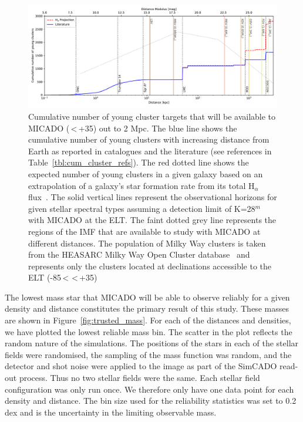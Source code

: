 \documentclass{aa}
\begin{document}
\begin{figure}

    \centering
    \includegraphics[width=\textwidth]{young_clusters_within_2Mpc_incl_MW.pdf}

    \caption{Cumulative number of young cluster targets that will be available to MICADO (\textdelta\,\textless\,+35\textdegree) out to 2 Mpc.
    The blue line shows the cumulative number of young clusters with increasing distance from Earth as reported in catalogues and the literature (see references in Table~\ref{tbl:cum_cluster_refs}).
    The red dotted line shows the expected number of young clusters in a given galaxy based on an extrapolation of a galaxy's star formation rate from its total H$_\alpha$ flux~\citep{caldwell09}.
    The solid vertical lines represent the observational horizons for given stellar spectral types assuming a detection limit of K=28$^m$ with MICADO at the ELT.
    The faint dotted grey line represents the regions of the IMF that are available to study with MICADO at different distances.
    The population of Milky Way clusters is taken from the HEASARC Milky Way Open Cluster database~\citep{heasarc_mwsc} and represents only the clusters located at declinations accessible to the ELT (-85\textdegree\,\textless\,\textdelta\,\textless\,+35\textdegree)
    }
    \label{fig:local_group_cluster_number}

\end{figure}


The lowest mass star that MICADO will be able to observe reliably for a given density and distance constitutes the primary result of this study.
These masses are shown in Figure~\ref{fig:trusted_mass}.
For each of the distances and densities, we have plotted the lowest reliable mass bin.
The scatter in the plot reflects the random nature of the simulations.
The positions of the stars in each of the stellar fields were randomised, the sampling of the mass function was random, and the detector and shot noise were applied to the image as part of the SimCADO read-out process.
Thus no two stellar fields were the same.
Each stellar field configuration was only run once.
We therefore only have one data point for each density and distance.
The bin size used for the reliability statistics was set to 0.2 dex and is the uncertainty in the limiting observable mass.
\end{document}
